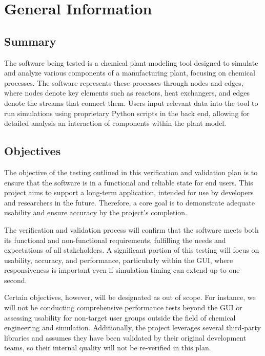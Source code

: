 \documentclass[12pt, titlepage]{article}
\begin{document}
\section{General Information}

\subsection{Summary}

The software being tested is a chemical plant modeling tool designed to simulate and analyze various components of a manufacturing plant, focusing on chemical processes. The software represents these processes through nodes and edges, where nodes denote key elements such as reactors, heat exchangers, and edges denote the streams that connect them. Users input relevant data into the tool to run simulations using proprietary Python scripts in the back end, allowing for detailed analysis an interaction of components within the plant model.


\subsection{Objectives}

The objective of the testing outlined in this verification and validation plan is to ensure that the software is in a functional and reliable state for end users. This project aims to support a long-term application, intended for use by developers and researchers in the future. Therefore, a core goal is to demonstrate adequate usability and ensure accuracy by the project’s completion.

The verification and validation process will confirm that the software meets both its functional and non-functional requirements, fulfilling the needs and expectations of all stakeholders. A significant portion of this testing will focus on usability, accuracy, and performance, particularly within the GUI, where responsiveness is important even if simulation timing can extend up to one second.

Certain objectives, however, will be designated as out of scope. For instance, we will not be conducting comprehensive performance tests beyond the GUI or assessing usability for non-target user groups outside the field of chemical engineering and simulation. Additionally, the project leverages several third-party libraries and assumes they have been validated by their original development teams, so their internal quality will not be re-verified in this plan.
\end{document}
